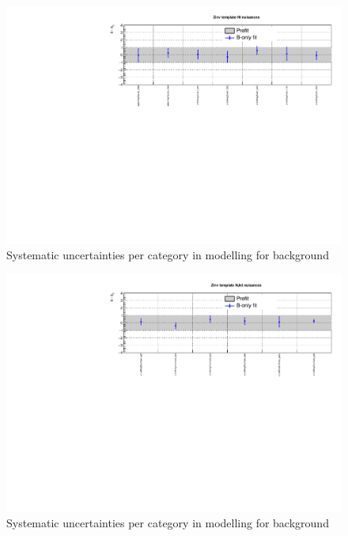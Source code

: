 \clearpage
\begin{figure}[h!]
  \centering
  \caption{Systematic uncertainties per \scalht category in \mht modelling for \znunuj background}
  \includegraphics[width=1.\linewidth]{figures/results/36invfb_preapproval/postfit/nuis/TemplateZinv_ht_nuisances}
\end{figure}

\begin{figure}[h!]
  \centering
  \caption{Systematic uncertainties per \njet category in \mht modelling for \znunuj background}
  \includegraphics[width=1.\linewidth]{figures/results/36invfb_preapproval/postfit/nuis/TemplateZinv_njet_nuisances}
\end{figure}

